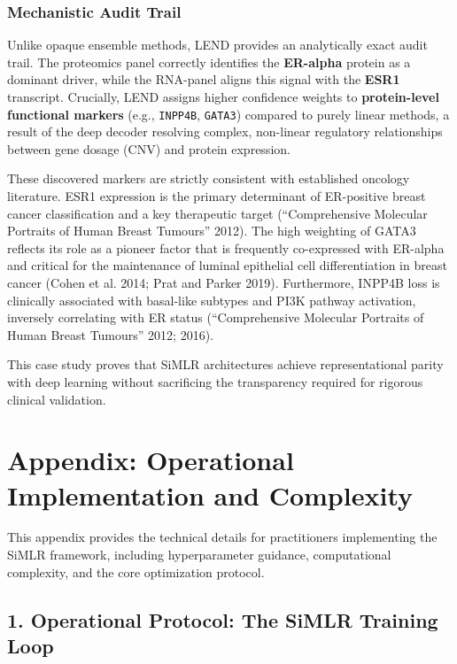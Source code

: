 \documentclass[
  letterpaper,
]{report}
\begin{document}
\subsection{Mechanistic Audit Trail}\label{mechanistic-audit-trail}

Unlike opaque ensemble methods, LEND provides an analytically exact
audit trail. The proteomics panel correctly identifies the
\textbf{ER-alpha} protein as a dominant driver, while the RNA-panel
aligns this signal with the \textbf{ESR1} transcript. Crucially, LEND
assigns higher confidence weights to \textbf{protein-level functional
markers} (e.g., \texttt{INPP4B}, \texttt{GATA3}) compared to purely
linear methods, a result of the deep decoder resolving complex,
non-linear regulatory relationships between gene dosage (CNV) and
protein expression.

These discovered markers are strictly consistent with established
oncology literature. ESR1 expression is the primary determinant of
ER-positive breast cancer classification and a key therapeutic target
({``Comprehensive Molecular Portraits of Human Breast Tumours''} 2012).
The high weighting of GATA3 reflects its role as a pioneer factor that
is frequently co-expressed with ER-alpha and critical for the
maintenance of luminal epithelial cell differentiation in breast cancer
(Cohen et al. 2014; Prat and Parker 2019). Furthermore, INPP4B loss is
clinically associated with basal-like subtypes and PI3K pathway
activation, inversely correlating with ER status ({``Comprehensive
Molecular Portraits of Human Breast Tumours''} 2012; 2016).

This case study proves that SiMLR architectures achieve representational
parity with deep learning without sacrificing the transparency required
for rigorous clinical validation.

\chapter{Appendix: Operational Implementation and
Complexity}\label{appendix-operational-implementation-and-complexity}

This appendix provides the technical details for practitioners
implementing the SiMLR framework, including hyperparameter guidance,
computational complexity, and the core optimization protocol.

\section{1. Operational Protocol: The SiMLR Training
Loop}\label{operational-protocol-the-simlr-training-loop}
\end{document}

